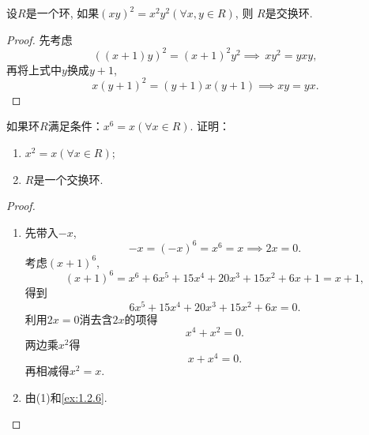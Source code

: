 \begin{problem}
    设$R$是一个环, 如果$(xy)^2 = x^2y^2 (\forall x, y \in R)$, 则
$R$是交换环.
\end{problem}

\begin{proof}
    先考虑
    \[
        ((x + 1)y)^2 = (x + 1)^2y^2 \implies\, xy^2 = yxy,
    \]
    再将上式中$y$换成$y + 1$,
    \[
        x(y + 1)^2 = (y + 1)x(y + 1) \implies xy = yx.
    \]
\end{proof}

\begin{problem}
    如果环$R$满足条件：$x^6 = x (\forall x \in R)$. 证明：
\begin{enumerate}[(1)]
    \item $x^2 = x (\forall x \in R)$;
    \item $R$是一个交换环.
\end{enumerate}
\end{problem}

\begin{proof}
\begin{enumerate}[(1)]
    \item 先带入$-x$,
\[
    -x = (-x)^6 = x^6 = x \implies 2x = 0.
\]
    考虑$(x + 1)^6$,
\[
    (x + 1)^6 = x^6 + 6x^5 + 15x^4 + 20x^3 + 15x^2 + 6x + 1 = x + 1,
\]
得到
\[
    6x^5 + 15x^4 + 20x^3 + 15x^2 + 6x = 0.
\]
利用$2x = 0$消去含$2x$的项得
\[
    x^4 + x^2 = 0.
\]
两边乘$x^2$得
\[
    x + x^4 = 0.
\]
再相减得$x^2 = x$.
    \item 由(1)和\ref{ex:1.2.6}.
\end{enumerate}
\end{proof}